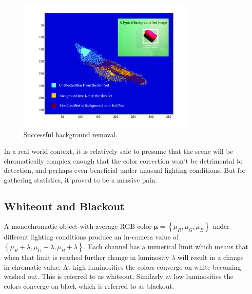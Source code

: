 \begin{figure}[h!]
  \centering
    \includegraphics[width=0.80\textwidth]{Chapter3/Figs/CaCb_bg_success.jpg}
    \caption{Successful background removal.}  \label{fig:BGSuccess}
\end{figure}

In a real world context, it is relatively safe to presume that the scene will be chromatically complex enough that the color correction won't be detrimental to detection, and perhaps even beneficial under unusual lighting conditions. But for gathering statistics, it proved to be a massive pain.

\subsection{Whiteout and Blackout}\label{sec:WhiteoutAndBlackout}
A monochromatic object with average RGB color $\mathbf{\mu}=\left\{\mu_R, \mu_G, \mu_B \right\}$ under different lighting conditions produce an in-camera value of $\left\{\mu_R +\lambda, \mu_G  +\lambda, \mu_B +\lambda \right\}$. Each channel has a numerical limit which means that when that limit is reached further change in luminosity $\lambda$ will result in a change in chromatic value. At high luminosities the colors converge on white becoming washed out. This is referred to as whiteout. Similarly at low luminosities the colors converge on black which is referred to as blackout.

